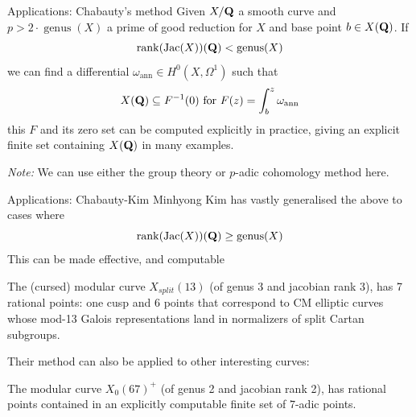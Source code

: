 \begin{frame}{Applications: Chabauty's method}
    Given $X/\mathbf Q$ a smooth curve and $p> 2\cdot\operatorname{genus}(X)$ a prime of good reduction for $X$ and base point $b \in X(\mathbf Q)$.
    If
    \[ \operatorname{rank}(\operatorname{Jac}(X))(\mathbf Q) < \operatorname{genus}(X) \]
    we can find a differential $\omega _{\text{ann}}\in H^0(X, \Omega ^1)$ such that
    \[
        X(\mathbf Q) \subseteq F^{-1}(0) \text{ for } F(z) = \int_b^z \omega_{\text{ann}}
    \]\pause
    this $F$ and its zero set can be computed explicitly in practice, giving an explicit finite set containing $X(\mathbf Q)$ in many examples.\pause

    \emph{Note:} We can use either the group theory or $p$-adic cohomology method here.

\end{frame}

\begin{frame}{Applications: Chabauty-Kim}
    Minhyong Kim has vastly generalised the above to cases where
    \[ \operatorname{rank}(\operatorname{Jac}(X))(\mathbf Q) \ge \operatorname{genus}(X)\]\pause
    This can be made effective, and computable
    \begin{theorem}
        The (cursed) modular curve \(X_{split}(13)\) (of genus 3 and jacobian rank 3),
        has 7 rational points: one cusp and 6 points that correspond to CM elliptic curves whose mod-13 Galois representations land in normalizers of split Cartan subgroups.
    \end{theorem}\pause

    Their method can also be applied to other interesting curves:

    \begin{theorem}
        The modular curve \(X_{0}(67)^+\) (of genus 2 and jacobian rank 2),
        has rational points contained in an explicitly computable finite set of $7$-adic points.
    \end{theorem}
\end{frame}

